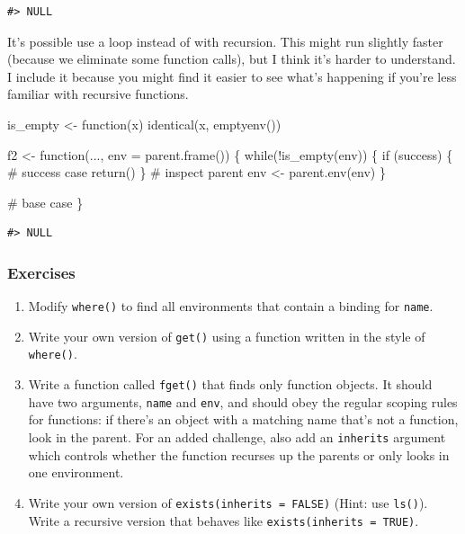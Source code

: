 \documentclass[oneside]{book}
\newenvironment{Shaded}{}{}
\newcommand{\KeywordTok} [1]{\textcolor[rgb]{0.00,0.44,0.13}{{#1}}}
\newcommand{\DataTypeTok}[1]{\textcolor[rgb]{0.56,0.13,0.00}{{#1}}}
\newcommand{\StringTok}  [1]{\textcolor[rgb]{0.25,0.44,0.63}{{#1}}}
\newcommand{\CommentTok} [1]{\textcolor[rgb]{0.38,0.63,0.69}{{#1}}}
\newcommand{\NormalTok}  [1]{{#1}}
\begin{document}
\begin{verbatim}
#> NULL
\end{verbatim}

It's possible use a loop instead of with recursion. This might run
slightly faster (because we eliminate some function calls), but I think
it's harder to understand. I include it because you might find it easier
to see what's happening if you're less familiar with recursive
functions.

\begin{Shaded}
\begin{Highlighting}[]
\NormalTok{is_empty <-}\StringTok{ }\NormalTok{function(x) }\KeywordTok{identical}\NormalTok{(x, }\KeywordTok{emptyenv}\NormalTok{())}

\NormalTok{f2 <-}\StringTok{ }\NormalTok{function(..., }\DataTypeTok{env =} \KeywordTok{parent.frame}\NormalTok{()) \{}
  \NormalTok{while(!}\KeywordTok{is_empty}\NormalTok{(env)) \{}
    \NormalTok{if (success) \{}
      \CommentTok{# success case}
      \KeywordTok{return}\NormalTok{()}
    \NormalTok{\}}
    \CommentTok{# inspect parent}
    \NormalTok{env <-}\StringTok{ }\KeywordTok{parent.env}\NormalTok{(env)}
  \NormalTok{\}}

  \CommentTok{# base case}
\NormalTok{\}}
\end{Highlighting}
\end{Shaded}

\begin{verbatim}
#> NULL
\end{verbatim}

\subsubsection{Exercises}\label{exercises-1}

\begin{enumerate}
\def\labelenumi{\arabic{enumi}.}
\item
  Modify \texttt{where()} to find all environments that contain a
  binding for \texttt{name}.
\item
  Write your own version of \texttt{get()} using a function written in
  the style of \texttt{where()}.
\item
  Write a function called \texttt{fget()} that finds only function
  objects. It should have two arguments, \texttt{name} and \texttt{env},
  and should obey the regular scoping rules for functions: if there's an
  object with a matching name that's not a function, look in the parent.
  For an added challenge, also add an \texttt{inherits} argument which
  controls whether the function recurses up the parents or only looks in
  one environment.
\item
  Write your own version of \texttt{exists(inherits = FALSE)} (Hint: use
  \texttt{ls()}). Write a recursive version that behaves like
  \texttt{exists(inherits = TRUE)}.
\end{enumerate}
\end{document}
